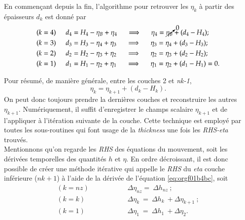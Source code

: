 \documentclass{article}
\numberwithin{equation}{section}
\begin{document}
En commençant depuis la fin, l'algorithme pour retrouver les \(\eta_k\) à partir des épaisseurs \(d_k\) est donné par
\begin{align}
        & (k=4) \hspace{0.5cm} d_4 = H_4 - \eta_B + \eta_4 \hspace{0.5cm} \Longrightarrow \hspace{0.5cm} \eta_4 = \cancelto{0}{\eta_B} + (d_4 - H_4); \\
        & (k=3) \hspace{0.5cm} d_3 = H_3 - \eta_4 + \eta_3 \hspace{0.5cm} \Longrightarrow \hspace{0.5cm} \eta_3 =\eta_4+(d_3-H_3);\\
        & (k=2) \hspace{0.5cm} d_2 = H_2 - \eta_3 + \eta_2 \hspace{0.5cm} \Longrightarrow \hspace{0.5cm} \eta_2 =\eta_3+(d_2-H_2);\\
        & (k=1) \hspace{0.5cm} d_1 = H_1 - \eta_2 + \eta_1 \hspace{0.5cm} \Longrightarrow \hspace{0.5cm} \eta_1 =\eta_2+(d_1-H_1) = 0.
\end{align}

Pour résumé, de manière générale, entre les couches 2 et \emph{nk-1},
\begin{equation}
\label{eq:orgf01b4bc}
\eta_k = \eta_{k+1} + (d_k - H_k).
\end{equation}
On peut donc toujours prendre la dernières couches et reconstruire les autres \(\eta_{k+1}\).
Numériquement, il suffit d'enregistrer le champs scalaire \(\eta_{k+1}\) et de l'appliquer à l'itération suivante de la couche.
Cette technique est employé par toutes les sous-routines qui font usage de la \emph{thickness} une fois les \emph{RHS-eta} trouvés.\\[0pt]


Mentionnons qu'on regarde les \emph{RHS} des équations du mouvement, soit les dérivées temporelles des quantités \(h\) et \(\eta\).
En ordre décroissant, il est donc possible de créer une méthode itérative qui appelle le \emph{RHS} du \emph{eta} couche inférieure (\(nk+1\)) à l'aide de la dérivée de l'équation \ref{eq:orgf01b4bc}, soit
\begin{align}
(k=nz)\hspace{2cm}    &\Delta \eta_{nz} =\ \Delta h_{nz}\ ;\nonumber\\
(k=k) \hspace{2cm} &\Delta \eta_{k}\ = \ \Delta h_k\ + \Delta \eta_{k+1}\ ;\\
(k=1) \hspace{2cm} &\Delta \eta_1\ = \ \Delta h_1\ + \Delta \eta_2. \nonumber 
\end{align}
\end{document}
